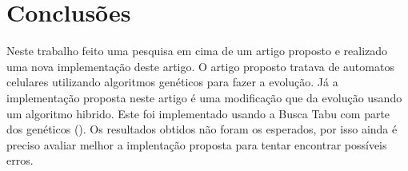 \documentclass[12pt]{article}
\begin{document}
\section{Conclusões}

Neste trabalho feito uma pesquisa em cima de um artigo proposto e realizado 
uma nova implementação deste artigo. O artigo proposto tratava de automatos
celulares utilizando algoritmos genéticos para fazer a evolução. Já a
implementação proposta neste artigo é uma modificação que da evolução usando
um algoritmo hibrido. Este foi implementado usando a Busca Tabu com parte dos
genéticos (). Os resultados obtidos não foram os esperados,
por isso ainda é preciso avaliar melhor a implentação proposta para tentar
encontrar possíveis erros.




\end{document}
